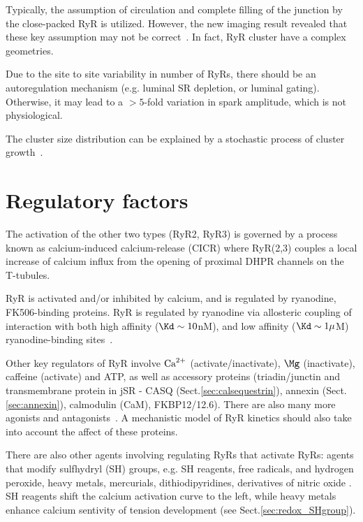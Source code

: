 Typically, the assumption of circulation and complete filling of the
junction by the close-packed RyR is utilized. However, the new imaging
result revealed that these key assumption may not be
correct~\citep{Baddeley2009}. In fact, RyR cluster have a complex
geometries.

Due to the site to site variability in number of RyRs, there should be
an autoregulation mechanism (e.g. luminal SR depletion, or luminal
gating). Otherwise, it may lead to a $>5$-fold variation in spark
amplitude, which is not physiological. 


The cluster size distribution can be explained by a stochastic process
of cluster growth~\citep{Baddeley2009}. 

\section{Regulatory factors}
\label{sec:ryr_regulation-factors}


The activation of the other two types (RyR2, RyR3) is governed by a process
known as calcium-induced calcium-release (CICR) where RyR(2,3) couples a local
increase of calcium influx from the opening of proximal DHPR channels on the
T-tubules. 

RyR is activated and/or inhibited by calcium, and is regulated by ryanodine,
FK506-binding proteins. RyR is regulated by ryanodine via allosteric coupling of
interaction with both high affinity ($\Kd\sim 10$nM), and low affinity ($\Kd\sim
1\mu$M) ryanodine-binding sites~\citep{Lai1988d,Wang1993}.

Other key regulators of RyR involve ${\text{Ca}^{2+}}$ (activate/inactivate), $\Mg$
(inactivate), caffeine (activate) and ATP, as well as accessory proteins
(triadin/junctin and transmembrane protein in jSR - CASQ
(Sect.\ref{sec:calsequestrin}), annexin (Sect.\ref{sec:annexin}), calmodulin
(CaM), FKBP12/12.6). There are also many more agonists and
antagonists~\citep{Dulhunty2007,Santonastasi2007}. A mechanistic model of RyR
kinetics should also take into account the affect of these proteins.

There are also other agents involving regulating RyRs that activate RyRs: agents
that modify sulfhydryl (SH) groups, e.g. SH reagents, free radicals, and
hydrogen peroxide, heavy metals, mercurials, dithiodipyridines, derivatives of
nitric oxide \citep{marengo1998}. SH reagents shift the calcium activation curve
to the left, while heavy metals enhance calcium sentivity of tension
development (see Sect.\ref{sec:redox_SHgroup}). 

